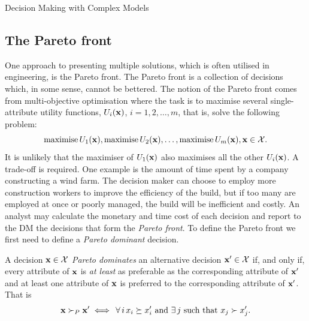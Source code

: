 \begin{chapter}{Decision Making with Complex Models \label{Chap:optimisation}}
\subsection{The Pareto front}
One approach to presenting multiple solutions, which is often utilised in engineering, is the Pareto front. The Pareto front is a collection of decisions which, in some sense, cannot be bettered. The notion of the Pareto front comes from multi-objective optimisation where the task is to maximise several single-attribute utility functions, $U_i(\mathbf{x})$, $i = 1, 2, \ldots, m$, that is, solve the following problem:
\begin{equation}
\text{maximise}\, U_1(\mathbf{x}),  \text{maximise}\, U_2(\mathbf{x}), \ldots, \text{maximise}\, U_m(\mathbf{x}), \mathbf{x} \in \mathcal{X}.
\end{equation}
It is unlikely that the maximiser of $U_1(\mathbf{x})$ also maximises all the other $U_i(\mathbf{x})$. A trade-off is required. One example is the amount of time spent by a company constructing a wind farm. The decision maker can choose to employ more construction workers to improve the efficiency of the build, but if too many are employed at once or poorly managed, the build will be inefficient and costly. An analyst may calculate the monetary and time cost of each decision and report to the DM the decisions that form the \textit{Pareto front}. To define the Pareto front we first need to define a \textit{Pareto dominant} decision.

A decision $\mathbf{x} \in \mathcal{X}$ \textit{Pareto dominates} an alternative decision $\mathbf{x}' \in \mathcal{X}$ if, and only if, every attribute of $\mathbf{x}$ is \textit{at least} as preferable as the corresponding attribute of $\mathbf{x}'$ and at least one attribute of $\mathbf{x}$ is preferred to the corresponding attribute of $\mathbf{x}'$. That is
 \begin{equation*}
 \mathbf{x} \succ_P \mathbf{x}' \iff \,\forall \, i\, x_i \succeq x_i' \text{ and } \exists\, j \text{ such that } x_j \succ x'_j.
 \end{equation*}


\end{chapter}

